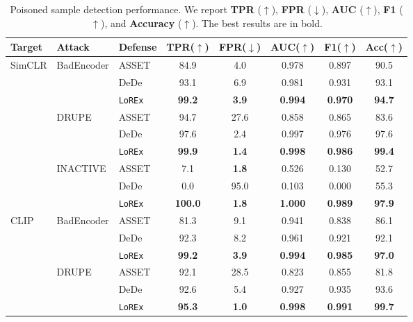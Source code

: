 \documentclass[letterpaper,twocolumn,10pt]{article}
\begin{document}
\begin{table}[!ht]
\centering
\caption{Poisoned sample detection performance. We report \textbf{TPR} ($\uparrow$), \textbf{FPR} ($\downarrow$), \textbf{AUC} ($\uparrow$), \textbf{F1} ($\uparrow$), and \textbf{Accuracy} ($\uparrow$). The best results are in bold.} 
\begin{tabular}{lllccccc}
\toprule
\textbf{Target} & \textbf{Attack} & \textbf{Defense} & \textbf{TPR($\uparrow$)} & \textbf{FPR($\downarrow$)} & \textbf{AUC($\uparrow$)} & \textbf{F1($\uparrow$)} & \textbf{Acc($\uparrow$)} \\
\midrule\midrule
\multirow{9}{*}{SimCLR}
 & \multirow{3}{*}{BadEncoder}
   & ASSET~\cite{asset} & 84.9 & 4.0 & 0.978 & 0.897 & 90.5 \\
 & & DeDe~\cite{hou2025dede} & 93.1 & 6.9 & 0.981 & 0.931 & 93.1 \\
 & & \texttt{LoREx} & \textbf{99.2} & \textbf{3.9} & \textbf{0.994} & \textbf{0.970} & \textbf{94.7} \\
 \cmidrule(lr){2-8}
 & \multirow{3}{*}{DRUPE}
   & ASSET & 94.7 & 27.6 & 0.858 & 0.865 & 83.6 \\
 & & DeDe & 97.6 & 2.4 & 0.997 & 0.976 & 97.6 \\
 & & \texttt{LoREx} & \textbf{99.9} & \textbf{1.4} & \textbf{0.998} & \textbf{0.986} & \textbf{99.4} \\
 \cmidrule(lr){2-8}
 & \multirow{3}{*}{INACTIVE}
   & ASSET & 7.1 & \textbf{1.8} & 0.526 & 0.130 & 52.7 \\
 & & DeDe & 0.0 & 95.0 & 0.103 & 0.000 & 55.3 \\
 & & \texttt{LoREx} & \textbf{100.0} & \textbf{1.8} & \textbf{1.000} & \textbf{0.989} & \textbf{97.9} \\
\midrule
\multirow{12}{*}{CLIP}
 & \multirow{3}{*}{BadEncoder}
   & ASSET & 81.3 & 9.1 & 0.941 & 0.838& 86.1 \\
 & & DeDe & 92.3 & 8.2 & 0.961 & 0.921 & 92.1 \\
 & & \texttt{LoREx} & \textbf{99.2} & \textbf{3.9} & \textbf{0.994} & \textbf{0.985} &\textbf{ 97.0} \\
 \cmidrule(lr){2-8}
 & \multirow{3}{*}{DRUPE}
   & ASSET & 92.1 & 28.5 & 0.823 & 0.855 & 81.8 \\
 & & DeDe & 92.6 & 5.4 & 0.927 & 0.935 & 93.6 \\
 & & \texttt{LoREx} & \textbf{95.3} & \textbf{1.0} & \textbf{0.998} & \textbf{0.991} & \textbf{99.7} \\

\end{tabular}
\end{table}
\end{document}
